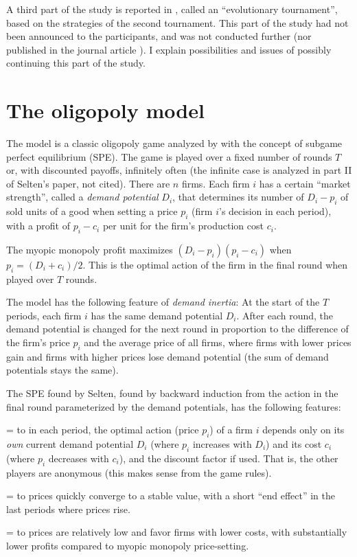 \documentclass[a4paper,12pt]{article}  %
\def\rmitem#1{\par\hangafter=1\hangindent=\einr
  \noindent\hbox to\einr{\ignorespaces#1\hfill}\ignorespaces}
\newcommand\bullitem{\rmitem{\raise.17ex\hbox{\kern7pt\scriptsize$\bullet$}}}
\theoremstyle{definition}
\begin{document}
A third part of the study is reported in \citet[pages
97--110]{Keser1992}, called an ``evolutionary tournament'',
based on the strategies of the second tournament.
This part of the study had not been announced to the
participants, and was not conducted further (nor published
in the journal article \citealp{Keser1993}). I explain
possibilities and issues of possibly
continuing this part of the study.

\section{The oligopoly model} 

The model is a classic oligopoly game analyzed by \citet{Selten1965}
with the concept of subgame perfect equilibrium
(SPE). The game is played over a fixed number of rounds $T$ or,
with discounted payoffs, infinitely often (the infinite case
is analyzed in part II of Selten's paper, not cited).
There are $n$ firms.
Each firm $i$ has a certain ``market strength'', called a
\textit{demand potential} $D_i$, that determines its number of
$D_i-p_i$ of sold units of a good when setting a price $p_i$
(firm $i$'s decision in each period),
with a profit of $p_i-c_i$ per unit for the firm's production cost
$c_i$.

The myopic monopoly profit maximizes $(D_i-p_i)(p_i-c_i)$
when $p_i=(D_i+c_i)/2$.
This is the optimal action of the firm in the final round
when played over $T$ rounds.

The model has the following feature of \textit{demand
inertia}:
At the start of the $T$ periods, each firm $i$ has the same
demand potential $D_i$.
After each round, the demand potential is changed for the
next round in proportion to the difference of the firm's
price $p_i$ and the average price of all firms, where firms
with lower prices gain and firms with higher prices lose
demand potential (the sum of demand potentials stays the
same).

The SPE found by Selten, found by backward induction from
the action in the final round parameterized by the demand
potentials, has the following features: 

\bullitem
in each period, the optimal action (price $p_i$) of a firm
$i$ depends only on its \textit{own}
current demand potential $D_i$
(where $p_i$ increases with $D_i$) and its cost $c_i$ (where
$p_i$ decreases with $c_i$), and the discount factor if used.
That is, the other players are anonymous (this makes sense
from the game rules). 
\bullitem
prices quickly converge to a stable value, with a short
  ``end effect'' in the last periods where prices rise.
\bullitem
prices are relatively low and favor firms with lower
  costs, with substantially lower profits compared to myopic
  monopoly price-setting.
\end{document}

